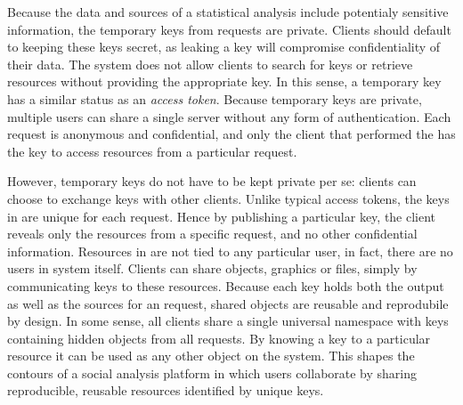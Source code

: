 Because the data and sources of a statistical analysis include potentialy sensitive information, the temporary keys from \RPC requests are private. Clients should default to keeping these keys secret, as leaking a key will compromise confidentiality of their data. The system does not allow clients to search for keys or retrieve resources without providing the appropriate key. In this sense, a temporary key has a similar status as an \emph{access token}. Because temporary keys are private, multiple users can share a single \OpenCPU server without any form of authentication. Each request is anonymous and confidential, and only the client that performed the \RPC has the key to access resources from a particular request.

However, temporary keys do not have to be kept private per se: clients can choose to exchange keys with other clients. Unlike typical access tokens, the keys in \OpenCPU are unique for each request. Hence by publishing a particular key, the client reveals only the resources from a specific \RPC request, and no other confidential information. Resources in \OpenCPU are not tied to any particular user, in fact, there are no users in \OpenCPU system itself. Clients can share objects, graphics or files, simply by communicating keys to these resources. Because each key holds both the output as well as the sources for an \RPC request, shared objects are reusable and reprodubile by design. In some sense, all clients share a single universal namespace with keys containing hidden objects from all \RPC requests. By knowing a key to a particular resource it can be used as any other object on the system. This shapes the contours of a social analysis platform in which users collaborate by sharing reproducible, reusable resources identified by unique keys.
